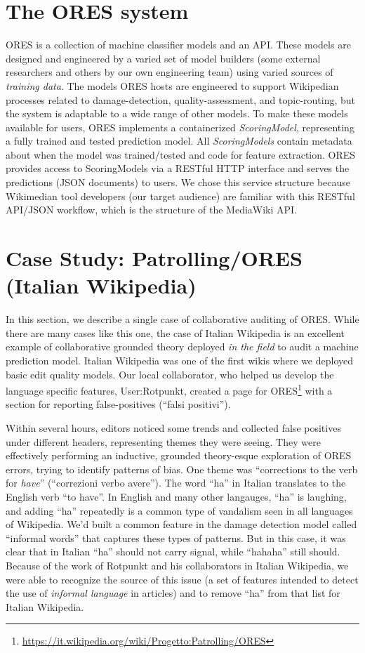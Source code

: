 \documentclass{sigchi-ext}
\begin{document}
\section{The ORES system}

ORES is a collection of machine classifier models and an API.  These models are designed and engineered by a varied set of model builders (some external researchers and others by our own engineering team) using varied sources of \emph{training data}.  The models ORES hosts are engineered to support Wikipedian processes related to damage-detection, quality-assessment, and topic-routing, but the system is adaptable to a wide range of other models. To make these models available for users, ORES implements a containerized \emph{ScoringModel}, representing a fully trained and tested prediction model.  All \emph{ScoringModels} contain metadata about when the model was trained/tested and code for feature extraction. ORES provides access to ScoringModels via a RESTful HTTP interface and serves the predictions (JSON documents) to users.  We chose this service structure because Wikimedian tool developers (our target audience) are familiar with this RESTful API/JSON workflow, which is the structure of the MediaWiki API.

\section{Case Study: Patrolling/ORES (Italian Wikipedia)}
In this section, we describe a single case of collaborative auditing of ORES.  While there are many cases like this one, the case of Italian Wikipedia is an excellent example of collaborative grounded theory deployed \emph{in the field} to audit a machine prediction model. Italian Wikipedia was one of the first wikis where we deployed basic edit quality models.  Our local collaborator, who helped us develop the language specific features, User:Rotpunkt, created a page for ORES\footnote{\url{https://it.wikipedia.org/wiki/Progetto:Patrolling/ORES}} with a section for reporting false-positives (``falsi positivi'').

Within several hours, editors noticed some trends and collected false positives under different headers, representing themes they were seeing.  They were effectively performing an inductive, grounded theory-esque exploration of ORES errors, trying to identify patterns of bias. One theme was ``corrections to the verb for \emph{have}'' (``correzioni verbo avere'').  The word ``ha'' in Italian translates to the English verb ``to have''.  In English and many other langauges, ``ha'' is laughing, and adding ``ha'' repeatedly is a common type of vandalism seen in all languages of Wikipedia.  We'd built a common feature in the damage detection model called ``informal words'' that captures these types of patterns.  But in this case, it was clear that in Italian ``ha'' should not carry signal, while ``hahaha'' still should. Because of the work of Rotpunkt and his collaborators in Italian Wikipedia, we were able to recognize the source of this issue (a set of features intended to detect the use of \emph{informal language} in articles) and to remove ``ha'' from that list for Italian Wikipedia.
\end{document}
